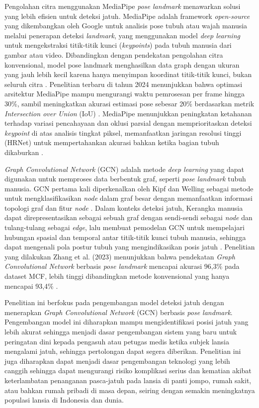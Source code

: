 Pengolahan citra menggunakan MediaPipe \textit{pose landmark} menawarkan solusi yang lebih efisien untuk deteksi jatuh. MediaPipe adalah framework \textit{open-source} yang dikembangkan oleh Google untuk analisis pose tubuh atau wajah manusia melalui penerapan deteksi \textit{landmark}, yang menggunakan model \textit{deep learning} untuk mengekstraksi titik-titik kunci (\textit{keypoints}) pada tubuh manusia dari gambar atau video. Dibandingkan dengan pendekatan pengolahan citra konvensional, model pose landmark menghasilkan data graph dengan ukuran yang jauh lebih kecil karena hanya menyimpan koordinat titik-titik kunci, bukan seluruh citra \cite{Lugaresi2019}. Penelitian terbaru di tahun 2024 menunjukkan bahwa optimasi arsitektur MediaPipe mampu mengurangi waktu pemrosesan per frame hingga 30\%, sambil meningkatkan akurasi estimasi pose sebesar 20\% berdasarkan metrik \textit{Intersection over Union} (IoU) \cite{Sengar2024}. MediaPipe menunjukkan peningkatan ketahanan terhadap variasi pencahayaan dan oklusi parsial dengan memprioritaskan deteksi \textit{keypoint} di atas analisis tingkat piksel, memanfaatkan jaringan resolusi tinggi (HRNet) untuk mempertahankan akurasi bahkan ketika bagian tubuh dikaburkan \cite{Raj2024}.\par

\textit{Graph Convolutional Network} (GCN) adalah metode \textit{deep learning} yang dapat digunakan untuk memproses data berbentuk graf, seperti \textit{pose landmark} tubuh manusia. GCN pertama kali diperkenalkan oleh Kipf dan Welling sebagai metode untuk mengklasifikasikan \textit{node} dalam graf besar dengan memanfaatkan informasi topologi graf dan fitur \textit{node} \cite{Kipf2016}. Dalam konteks deteksi jatuh, Kerangka manusia dapat direpresentasikan sebagai sebuah graf dengan sendi-sendi sebagai \textit{node} dan tulang-tulang sebagai \textit{edge}, lalu membuat pemodelan GCN untuk mempelajari hubungan spasial dan temporal antar titik-titik kunci tubuh manusia, sehingga dapat mengenali pola postur tubuh yang mengindikasikan posis jatuh \cite{Zahan2025}. Penelitian yang dilakukan Zhang et al. (2023) menunjukkan bahwa pendekatan \textit{Graph Convolutional Network} berbasis \textit{pose landmark} mencapai akurasi 96,3\% pada dataset MCF, lebih tinggi dibandingkan metode konvensional yang hanya mencapai 93,4\% \cite{Zhang2023}.\par

Penelitian ini berfokus pada pengembangan model deteksi jatuh dengan menerapkan \textit{Graph Convolutional Network} (GCN) berbasis \textit{pose landmark}. Pengembangan model ini diharapkan mampu mengidentifikasi posisi jatuh yang lebih akurat sehingga menjadi dasar pengembangan sistem yang baru untuk peringatan dini kepada pengasuh atau petugas medis ketika subjek lansia mengalami jatuh, sehingga pertolongan dapat segera diberikan. Penelitian ini juga diharapkan dapat menjadi dasar pengembangan teknologi yang lebih canggih sehingga dapat mengurangi risiko komplikasi serius dan kematian akibat keterlambatan penanganan pasca-jatuh pada lansia di panti jompo, rumah sakit, atau bahkan rumah pribadi di masa depan, seiring dengan semakin meningkatnya populasi lansia di Indonesia dan dunia.\par

